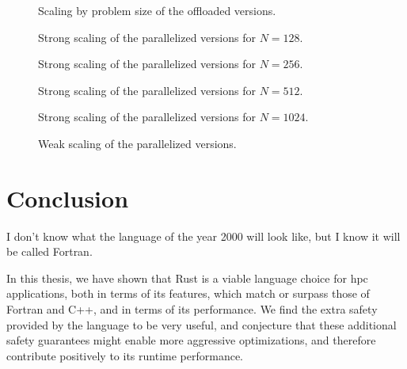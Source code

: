 \documentclass[british]{scrreprt}
\begin{document}
\begin{figure}
	\centering
	{\sffamily
		
	}
	\caption{Scaling by problem size of the offloaded versions.}
	\label{fig:scaling-gpu}
\end{figure}

\begin{figure}
	\centering
	{\sffamily
		
	}
	\caption{Strong scaling of the parallelized versions for \( N = 128 \).}
	\label{fig:strong-scaling-cpu-128}
\end{figure}

\begin{figure}
	\centering
	{\sffamily
		
	}
	\caption{Strong scaling of the parallelized versions for \( N = 256 \).}
	\label{fig:strong-scaling-cpu-256}
\end{figure}

\begin{figure}
	\centering
	{\sffamily
		
	}
	\caption{Strong scaling of the parallelized versions for \( N = 512 \).}
	\label{fig:strong-scaling-cpu-512}
\end{figure}

\begin{figure}
	\centering
	{\sffamily
		
	}
	\caption{Strong scaling of the parallelized versions for \( N = 1024 \).}
	\label{fig:strong-scaling-cpu-1024}
\end{figure}

\begin{figure}
	\centering
	{\sffamily
		
	}
	\caption{Weak scaling of the parallelized versions.}
	\label{fig:weak-scaling-cpu}
\end{figure}

\chapter{Conclusion}
\label{ch:conclusion}
\begin{displayquote}
	I don't know what the language of the year 2000 will look like, but I know it will be called Fortran.
\end{displayquote}

In this thesis, we have shown that Rust is a viable language choice for \gls{hpc} applications, both in terms of its features, which match or surpass those of Fortran and C++, and in terms of its performance. We find the extra safety provided by the language to be very useful, and conjecture that these additional safety guarantees might enable more aggressive optimizations, and therefore contribute positively to its runtime performance. 
\end{document}
